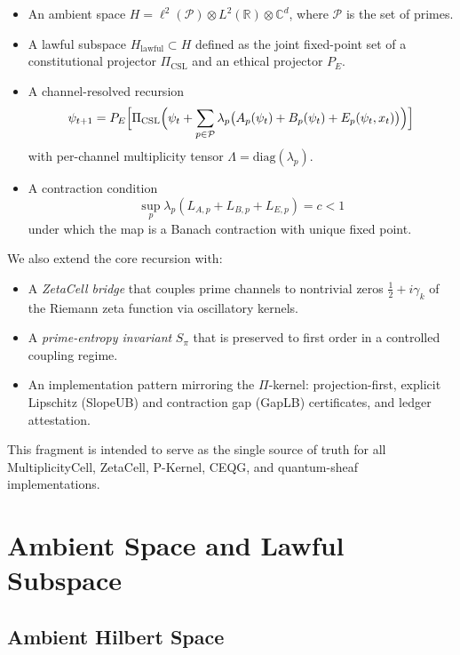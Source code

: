 \documentclass[11pt]{article}
\begin{document}
\begin{itemize}[leftmargin=1.5em]
  \item An ambient space $H = \ell^2(\mathcal{P}) \otimes L^2(\mathbb{R}) \otimes \mathbb{C}^d$, where $\mathcal{P}$ is the set of primes.
  \item A lawful subspace $H_{\text{lawful}} \subset H$ defined as the joint fixed-point set of a constitutional projector $\Pi_{\text{CSL}}$ and an ethical projector $P_E$.
  \item A channel-resolved recursion
  \[
    \psi_{t+1} = P_E \Bigl[ \Pi_{\text{CSL}} \Bigl( \psi_t + \sum_{p \in \mathcal{P}} \lambda_p \bigl( A_p(\psi_t) + B_p(\psi_t) + E_p(\psi_t,x_t) \bigr) \Bigr) \Bigr]
  \]
  with per-channel multiplicity tensor $\Lambda = \mathrm{diag}(\lambda_p)$.
  \item A contraction condition
  \[
    \sup_{p} \lambda_p \left( L_{A,p} + L_{B,p} + L_{E,p} \right) = c < 1
  \]
  under which the map is a Banach contraction with unique fixed point.
\end{itemize}

We also extend the core recursion with:

\begin{itemize}[leftmargin=1.5em]
  \item A \emph{ZetaCell bridge} that couples prime channels to nontrivial zeros $\frac{1}{2} + i\gamma_k$ of the Riemann zeta function via oscillatory kernels.
  \item A \emph{prime-entropy invariant} $S_\pi$ that is preserved to first order in a controlled coupling regime.
  \item An implementation pattern mirroring the $\Pi$-kernel: projection-first, explicit Lipschitz (SlopeUB) and contraction gap (GapLB) certificates, and ledger attestation.
\end{itemize}

This fragment is intended to serve as the single source of truth for all MultiplicityCell, ZetaCell, P-Kernel, CEQG, and quantum-sheaf implementations.

\section{Ambient Space and Lawful Subspace}

\subsection{Ambient Hilbert Space}
\end{document}
